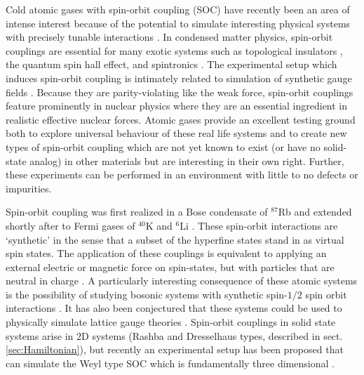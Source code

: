 \documentclass[%
 preprint,
 amsmath,amssymb,
 aps,
]{revtex4-1}
\begin{document}
Cold atomic gases with spin-orbit coupling (SOC) have recently been an area of intense interest because of the potential to simulate interesting physical systems with precisely tunable interactions \cite{nature11841}. In condensed matter physics, spin-orbit couplings are essential for many exotic systems such as topological insulators \cite{das2013engineering,PhysRevLett.105.255302}, the quantum spin hall effect\cite{nature12185}, and spintronics \cite{RevModPhys.76.323}. The experimental setup which induces spin-orbit coupling is intimately related to simulation of synthetic gauge fields \cite{RevModPhys.83.1523,hamner2014dicke,Lin:2009zzb,Bermudez:2011db}. Because they are parity-violating like the weak force, spin-orbit couplings feature prominently in nuclear physics where they are an essential ingredient in realistic effective nuclear forces. Atomic gases provide an excellent testing ground both to explore universal behaviour of these real life systems and to create new types of spin-orbit coupling which are not yet known to exist (or have no solid-state analog) in other materials but are interesting in their own right. Further, these experiments can be performed in an environment with little to no defects or impurities.

Spin-orbit coupling was first realized in a Bose condensate of $^{87}$Rb \cite{nature09887} and extended shortly after to Fermi gases of $^{40}$K \cite{PhysRevLett.109.095301} and $^6$Li \cite{PhysRevLett.109.095302}. These spin-orbit interactions are `synthetic' in the sense that a subset of the hyperfine states stand in as virtual spin states.   The application of these couplings is equivalent to applying an external electric or magnetic force on spin-states, but with particles that are neutral in charge \cite{Lin:2011,PhysRevLett.107.255301}.  A particularly interesting consequence of these atomic systems is the possibility of studying bosonic systems with synthetic spin-$1/2$ spin orbit interactions \cite{PhysRevA.68.063612,nature09887}.   It has also been conjectured that these systems could be used to physically simulate lattice gauge theories \cite{Bermudez:2010da,Mazza:2011kf}.  Spin-orbit couplings in solid state systems arise in 2D systems (Rashba and Dresselhaus types, described in sect. \ref{sec:Hamiltonian}), but recently an experimental setup has been proposed that can simulate the Weyl type SOC which is fundamentally three dimensional \cite{PhysRevLett.108.235301}.
\end{document}
